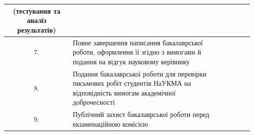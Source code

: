 \begin{landscape}
\begin{center}
\begin{singlespace}
\begin{tabular}{|c|p{14cm}|p{3cm}|p{2.5cm}|p{2cm}|p{2.25cm}|}
        (тестування та аналіз результатів) &
        & & & \\
        \hline
        7. & Повне завершення написання бакалаврської роботи, оформлення її згідно з вимогами й подання на відгук науковому керівнику &
        & & & \\
        \hline
        8. & Подання бакалаврської роботи для перевірки письмових робіт студентів НаУКМА на відповідність вимогам академічної доброчесності &
        & & & \\
        \hline
        9. & Публічний захист бакалаврської роботи перед екзаменаційною комісією &
        & & & \\
        \hline
    \end{tabular}\\[1em]
    \begin{flushleft}\end{flushleft}
    \end{singlespace}
\end{center}
\end{landscape}
\clearpage
\restoregeometry
\newpage
